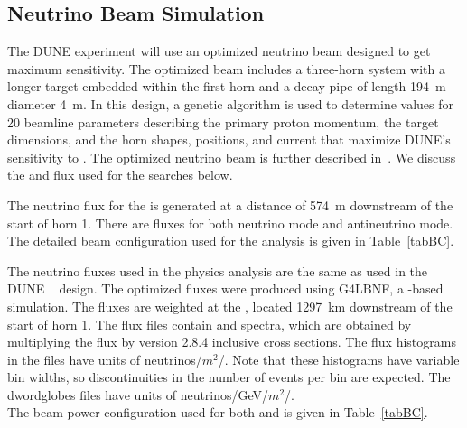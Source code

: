 \subsection{Neutrino Beam Simulation}
\label{Nusim}
The DUNE experiment will use an optimized neutrino beam designed to get maximum  sensitivity. The optimized beam includes  a three-horn system with a longer target embedded within the first horn and a decay pipe of length \SI{194}{m} diameter \SI{4}{m}.  In this design, a genetic algorithm is used to determine values for 20 beamline parameters describing the primary proton momentum, the target dimensions, and the horn shapes, positions, and current that maximize DUNE's sensitivity to . The optimized neutrino beam is further described in~\cite{Laura:2017}. We discuss the  and  flux used for the  searches below. 

The neutrino flux for the  is generated at a distance of \SI{574}{m}  downstream of the start of horn 1. There are fluxes for both neutrino mode and antineutrino mode. The detailed beam configuration used for the   analysis is given in Table~\ref{tabBC}. 

The neutrino fluxes used in the     physics analysis are the same as used in the DUNE ~\cite{Strait:2016mof} design. The optimized fluxes were produced using G4LBNF, a -based simulation.  The  fluxes are weighted 
 at the , located \SI{1297}{km} downstream of the start of horn 1. The flux files  contain  and  spectra, which are obtained by multiplying the flux by  version 2.8.4 
 inclusive cross sections.  The flux histograms in the   files 
 have
units of neutrinos/$m^{2}$/. Note that these histograms have variable bin widths, so discontinuities in the number of events per bin are expected. The \\dword{globes} files have units of neutrinos/GeV/$m^{2}$/.\\
The beam power configuration used for both  and  is given in Table~\ref{tabBC}.

